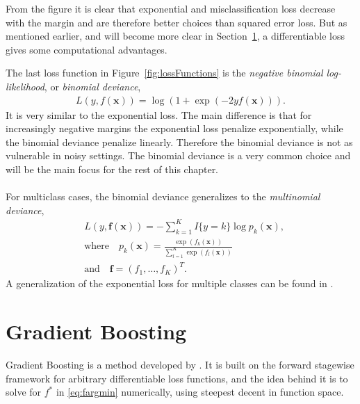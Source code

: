 From the figure it is clear that exponential and misclassification loss decrease with the margin and are therefore better choices than squared error loss. But as mentioned earlier, and will become more clear in Section~\ref{sec:Gradient Boosting}, a differentiable loss gives some computational advantages. 

The last loss function in Figure~\ref{fig:lossFunctions} is the \textit{negative binomial log-likelihood}, or \textit{binomial deviance},
\begin{align}
  L(y, f(\mathbf{x})) = \log \left( 1 + \exp (-2 y f(\mathbf{x})) \right).
\end{align}
It is very similar to the exponential loss. The main difference is that for increasingly negative margins the exponential loss penalize exponentially, while the binomial deviance penalize linearly. Therefore the binomial deviance is not as vulnerable in noisy settings. The binomial deviance is a very common choice and will be the main focus for the rest of this chapter. 
\\
\\
For multiclass cases, the binomial deviance generalizes to the \textit{multinomial deviance},
\begin{align}
  \label{eq:multinomialDeviance} 
  &L(y, \mathbf{f}( \mathbf{x })) = - \sum^{K}_{k=1} I\{y = k\} \log p_k(\mathbf{x}), \\
  \label{eq:multinomialDevianceProb} 
  &\text{where} \quad p_k(\mathbf{x}) = \frac{\exp (f_k(\mathbf{x}))}{\sum^{K}_{l=1} \exp (f_l(\mathbf{x}))}\\
  &\text{and} \quad \mathbf{f} = (f_1, \ldots, f_K)^T.
\end{align}
A generalization of the exponential loss for multiple classes can be found in \cite{zhu2009}.
\section{Gradient Boosting}
\label{sec:Gradient Boosting}
Gradient Boosting is a method developed by \cite{friedman}. It is built on the forward stagewise framework for arbitrary differentiable loss functions, and the idea behind it is to solve for $f^*$ in \eqref{eq:fargmin} numerically, using steepest decent in function space.

